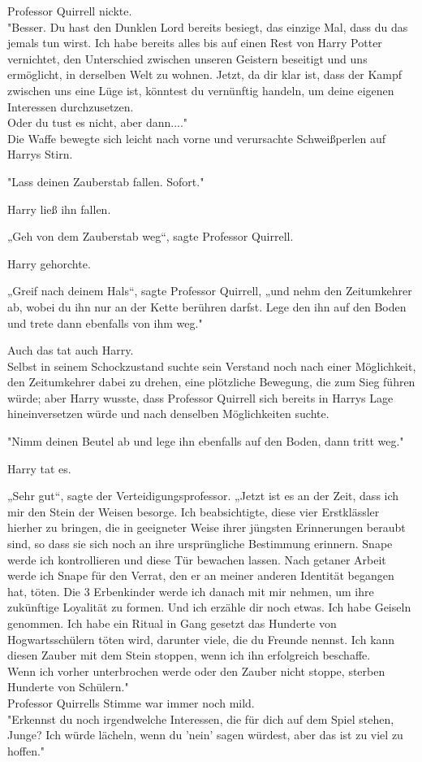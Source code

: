 {Professor Quirrell nickte.\\ "Besser. Du hast den Dunklen Lord bereits besiegt, das einzige Mal, dass du das jemals tun wirst. Ich habe bereits alles bis auf einen Rest von Harry Potter vernichtet, den Unterschied zwischen unseren Geistern beseitigt und uns ermöglicht, in derselben Welt zu wohnen. Jetzt, da dir klar ist, dass der Kampf zwischen uns eine Lüge ist, könntest du vernünftig handeln, um deine eigenen Interessen durchzusetzen.\\ Oder du tust es nicht, aber dann...."\\ Die Waffe bewegte sich leicht nach vorne und verursachte Schweißperlen auf Harrys Stirn.

"Lass deinen Zauberstab fallen. Sofort."

Harry ließ ihn fallen.

„Geh von dem Zauberstab weg“, sagte Professor Quirrell.

Harry gehorchte.

„Greif nach deinem Hals“, sagte Professor Quirrell, „und nehm den Zeitumkehrer ab, wobei du ihn nur an der Kette berühren darfst. Lege den ihn auf den Boden und trete dann ebenfalls von ihm weg."

Auch das tat auch Harry.\\ Selbst in seinem Schockzustand suchte sein Verstand noch nach einer Möglichkeit, den Zeitumkehrer dabei zu drehen, eine plötzliche Bewegung, die zum Sieg führen würde; aber Harry wusste, dass Professor Quirrell sich bereits in Harrys Lage hineinversetzen würde und nach denselben Möglichkeiten suchte.

"Nimm deinen Beutel ab und lege ihn ebenfalls auf den Boden, dann tritt weg."

Harry tat es.

„Sehr gut“, sagte der Verteidigungsprofessor. „Jetzt ist es an der Zeit, dass ich mir den Stein der Weisen besorge. Ich beabsichtigte, diese vier Erstklässler hierher zu bringen, die in geeigneter Weise ihrer jüngsten Erinnerungen beraubt sind, so dass sie sich noch an ihre ursprüngliche Bestimmung erinnern. Snape werde ich kontrollieren und diese Tür bewachen lassen. Nach getaner Arbeit werde ich Snape für den Verrat, den er an meiner anderen Identität begangen hat, töten. Die 3 Erbenkinder werde ich danach mit mir nehmen, um ihre zukünftige Loyalität zu formen. Und ich erzähle dir noch etwas. Ich habe Geiseln genommen. Ich habe ein Ritual in Gang gesetzt das Hunderte von Hogwartsschülern töten wird, darunter viele, die du Freunde nennst. Ich kann diesen Zauber mit dem Stein stoppen, wenn ich ihn erfolgreich beschaffe.\\ Wenn ich vorher unterbrochen werde oder den Zauber nicht stoppe, sterben Hunderte von Schülern."\\ Professor Quirrells Stimme war immer noch mild.\\ "Erkennst du noch irgendwelche Interessen, die für dich auf dem Spiel stehen, Junge? Ich würde lächeln, wenn du 'nein' sagen würdest, aber das ist zu viel zu hoffen."

}
